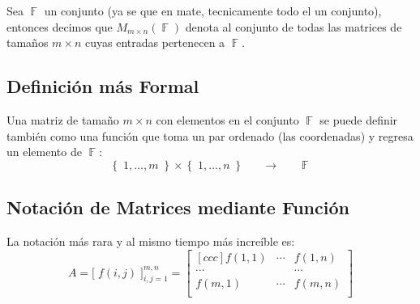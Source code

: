 \documentclass[12pt, fleqn]{report}                             %
\DeclareMathOperator \Space     {\quad}                         %
\theoremstyle{break}                                            %
\newcommand \lLongTo {\longrightarrow}                          %
\DeclareMathOperator \GenericField {\mathbb{F}}                 %
\newcommand{\Set}[1]            {\left\{ \; #1 \; \right\}}     %
\newcommand{\BigBrackets}[1]    {\Big[ \; #1 \; \Big]}          %
\begin{document}
            Sea $\GenericField$ un conjunto (ya se que en mate, tecnicamente todo el un conjunto),
            entonces decimos que $M_{m \times n}(\GenericField)$ denota al conjunto de todas las
            matrices de tamaños $m \times n$ cuyas entradas pertenecen a $\GenericField$.


            \vspace{2em}
            \subsection*{Definición más Formal}
                Una matriz de tamaño $m \times n$ con elementos en el conjunto $\GenericField$ se puede
                definir también como una función que toma un par ordenado (las coordenadas) y regresa
                un elemento de $\GenericField$: 
                \begin{equation*}
                    \Set{1, \dots, m} \times \Set{1, \dots , n}
                        \Space \lLongTo \Space
                    \GenericField
                \end{equation*}


            \clearpage
            \subsection{Notación de Matrices mediante Función}

                La notación más rara y al mismo tiempo más increíble es:
                \begin{equation*}
                    A   
                        = \BigBrackets{ f(i,j) }_{i, j = 1}^{m, n}
                        =
                        \begin{bmatrix}[ccc]
                            f(1,1)  & \cdots & f(1,n)   \\
                            \cdots  &        & \cdots   \\
                            f(m, 1) & \cdots & f(m,n)   \\
                        \end{bmatrix}
                \end{equation*}
\end{document}
